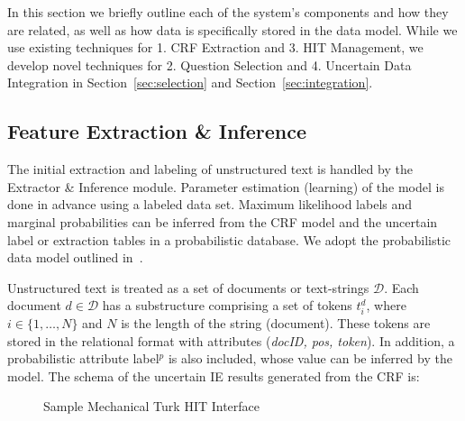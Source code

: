 In this section we briefly outline each of the system's components and how they are related, as well as how data is specifically stored in the data model.
While we use existing techniques for 1. CRF Extraction and 3. HIT Management, we develop novel techniques for 2. Question Selection and 4. Uncertain Data Integration in Section~\ref{sec:selection} and Section~\ref{sec:integration}.

\subsection{Feature Extraction \& Inference}

The initial extraction and labeling of unstructured text is handled by the Extractor \& Inference module.  Parameter estimation
(learning) of the model is done in advance using a labeled data set. Maximum likelihood labels and marginal probabilities can be inferred from the CRF model and the uncertain label or extraction tables in a probabilistic database. We adopt the probabilistic data model outlined in~\cite{DBLP:journals/pvldb/WangFGH10}.

Unstructured text is treated as a set of documents or text-strings $\mathcal{D}$.  Each document $d \in \mathcal{D}$ has a substructure comprising a set of tokens $t^{d}_{i}$, where $i \in \{1, \dots, N\}$ and $N$ is the length of the string (document). These tokens are stored in the relational format with attributes (\emph{docID, pos, token}). In addition, a probabilistic attribute label$^{p}$ is also included, whose value can be inferred by the model. The schema of the uncertain IE results generated from the CRF is: \

\begin{figure}[t]
        \centering
	\setlength\fboxsep{0pt}
	\setlength\fboxrule{0.5pt}
        \caption{Sample Mechanical Turk HIT Interface}
        \label{fig:HIT_int}
\end{figure}

